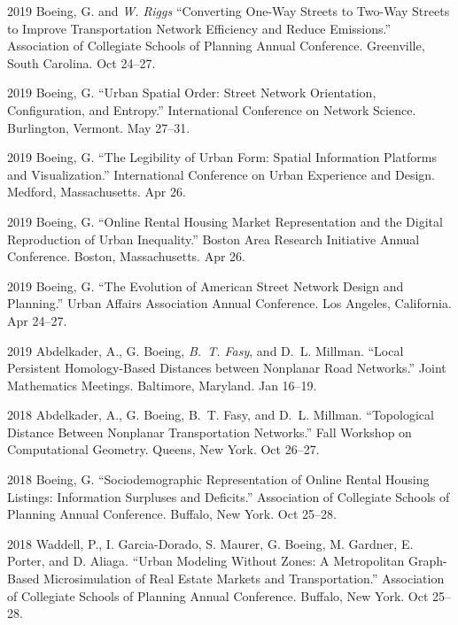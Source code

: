 \documentclass[12pt,letterpaper]{report}
\begin{document}
\begin{tablist}
        \item[2019] \tab Boeing, G. and \textit{W. Riggs} \enquote{Converting One-Way Streets to Two-Way Streets to Improve Transportation Network Efficiency and Reduce Emissions.} Association of Collegiate Schools of Planning Annual Conference. Greenville, South Carolina. Oct 24--27.

        \item[2019] \tab Boeing, G. \enquote{Urban Spatial Order: Street Network Orientation, Configuration, and Entropy.} International Conference on Network Science. Burlington, Vermont. May 27--31.

        \item[2019] \tab Boeing, G. \enquote{The Legibility of Urban Form: Spatial Information Platforms and Visualization.} International Conference on Urban Experience and Design. Medford, Massachusetts. Apr 26.

        \item[2019] \tab Boeing, G. \enquote{Online Rental Housing Market Representation and the Digital Reproduction of Urban Inequality.} Boston Area Research Initiative Annual Conference. Boston, Massachusetts. Apr 26.

        \item[2019] \tab Boeing, G. \enquote{The Evolution of American Street Network Design and Planning.} Urban Affairs Association Annual Conference. Los Angeles, California. Apr 24--27.

        \item[2019] \tab Abdelkader, A., G. Boeing, \textit{B.~T. Fasy}, and D.~L. Millman. \enquote{Local Persistent Homology-Based Distances between Nonplanar Road Networks.} Joint Mathematics Meetings. Baltimore, Maryland. Jan 16--19.

        \item[2018] \tab Abdelkader, A., G. Boeing, B.~T. Fasy, and D.~L. Millman. \enquote{Topological Distance Between Nonplanar Transportation Networks.} Fall Workshop on Computational Geometry. Queens, New York. Oct 26--27.

        \item[2018] \tab Boeing, G. \enquote{Sociodemographic Representation of Online Rental Housing Listings: Information Surpluses and Deficits.} Association of Collegiate Schools of Planning Annual Conference. Buffalo, New York. Oct 25--28.

        \item[2018] \tab Waddell, P., I. Garcia-Dorado, S. Maurer, G. Boeing, M. Gardner, E. Porter, and D. Aliaga. \enquote{Urban Modeling Without Zones: A Metropolitan Graph-Based Microsimulation of Real Estate Markets and Transportation.} Association of Collegiate Schools of Planning Annual Conference. Buffalo, New York. Oct 25--28.


\end{tablist}
\end{document}
